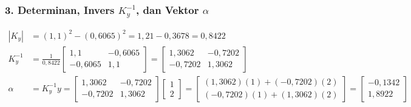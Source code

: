 \documentclass[11pt,a4paper]{article}
\def\boldsymbol#1{#1}%
\def\mathbf#1{#1}%
\begin{document}
\subsubsection*{3. Determinan, Invers \texorpdfstring{$K_y^{-1}$}{Ky^(-1)}, dan Vektor \texorpdfstring{$\boldsymbol{\alpha}$}{alpha}}
\begin{align}
|K_y| &= (1{,}1)^2 - (0{,}6065)^2 = 1{,}21 - 0{,}3678 = 0{,}8422 \\
K_y^{-1} &= \frac{1}{0{,}8422} \begin{bmatrix} 1{,}1 & -0{,}6065 \\ -0{,}6065 & 1{,}1 \end{bmatrix} = \begin{bmatrix} 1{,}3062 & -0{,}7202 \\ -0{,}7202 & 1{,}3062 \end{bmatrix} \\
\boldsymbol{\alpha} &= K_y^{-1} \mathbf{y} = \begin{bmatrix} 1{,}3062 & -0{,}7202 \\ -0{,}7202 & 1{,}3062 \end{bmatrix} \begin{bmatrix} 1 \\ 2 \end{bmatrix} = \begin{bmatrix} (1{,}3062)(1) + (-0{,}7202)(2) \\ (-0{,}7202)(1) + (1{,}3062)(2) \end{bmatrix} = \begin{bmatrix} -0{,}1342 \\ 1{,}8922 \end{bmatrix}
\end{align}
\end{document}
